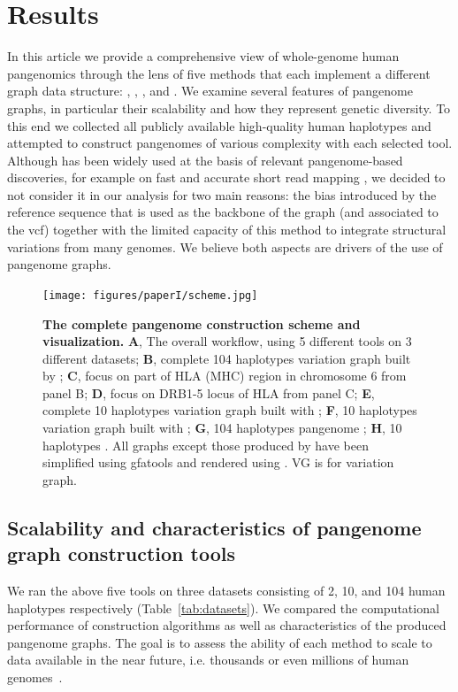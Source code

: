 \section{Results}
In this article we provide a comprehensive view of whole-genome human pangenomics through the lens of five methods that each implement a different graph data structure: \mbox{\bifrost}, \mbox{\mdbg}, \mbox{\minigraph}, \mbox{\mcactus} and \mbox{\pggb}. We examine several features of pangenome graphs, in particular their scalability and how they represent genetic diversity. To this end we collected all publicly available high-quality human haplotypes and attempted to construct pangenomes of various complexity with each selected tool.
Although \mbox{\vg} has been widely used at the basis of relevant pangenome-based discoveries, for example on fast and accurate short read mapping \mbox{\cite{giraffe}}, we decided to not consider it in our analysis for two main reasons: the bias introduced by the reference sequence that is used as the backbone of the graph (and associated to the vcf) together with the limited capacity of this method to integrate structural variations from many genomes. We believe both aspects are drivers of the use of pangenome graphs.
\begin{figure}[htp]
	\centering
	\texttt{[image: figures/paperI/scheme.jpg]}
	\caption[The complete human pangenome construction scheme and visualization.]{\textbf{The complete pangenome construction scheme and visualization.} \textbf{A}, The overall workflow, using 5 different tools on 3 different datasets; \textbf{B}, complete 104 haplotypes variation graph built by \minigraph; \textbf{C}, focus on part of HLA (MHC) region in chromosome 6 from panel B; \textbf{D}, focus on DRB1-5 locus of HLA from panel C; \textbf{E}, complete 10 haplotypes variation graph built with \pggb; \textbf{F}, 10 haplotypes variation graph built with \mcactus; \textbf{G}, 104 haplotypes pangenome \mdbg; \textbf{H}, 10 haplotypes \bifrost \dbg. All graphs except those produced by \minigraph have been simplified using gfatools and rendered using \bandage. VG is for variation graph.}
	\label{fig:figure1}
\end{figure}


\subsection*{\textbf{Scalability and characteristics of pangenome graph construction tools \label{sec:results}}}
\label{sec:scalablility}
We ran the above five tools on three datasets consisting of 2, 10, and 104 human haplotypes respectively (Table~\mbox{\ref{tab:datasets}}). We compared the computational performance of construction algorithms as well as characteristics of the produced pangenome graphs.
The goal is to assess the ability of each method to scale to data available in the near future, i.e. thousands or even millions of human genomes~\cite{human-pangenomics-era}. \\

